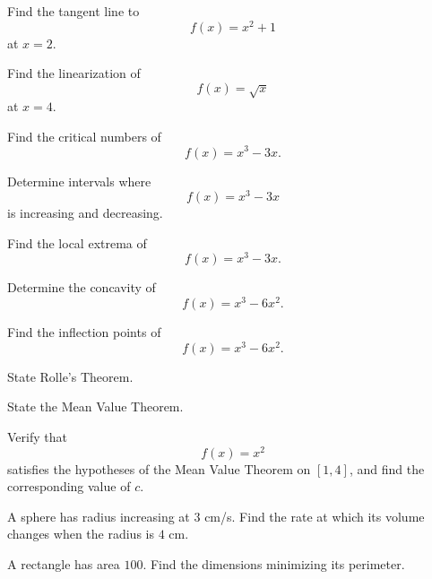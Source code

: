 \begin{exercise}[2]
Find the tangent line to
\[ f(x)=x^2+1 \]
at \(x=2\).
\end{exercise}

\begin{exercise}[2]
Find the linearization of
\[ f(x)=\sqrt{x} \]
at \(x=4\).
\end{exercise}

\begin{exercise}[1]
Find the critical numbers of
\[ f(x)=x^3-3x. \]
\end{exercise}

\begin{exercise}[2]
Determine intervals where
\[ f(x)=x^3-3x \]
is increasing and decreasing.
\end{exercise}

\begin{exercise}[2]
Find the local extrema of
\[ f(x)=x^3-3x. \]
\end{exercise}

\begin{exercise}[2]
Determine the concavity of
\[ f(x)=x^3-6x^2. \]
\end{exercise}

\begin{exercise}[2]
Find the inflection points of
\[ f(x)=x^3-6x^2. \]
\end{exercise}

\begin{exercise}[1]
State Rolle's Theorem.
\end{exercise}

\begin{exercise}[1]
State the Mean Value Theorem.
\end{exercise}

\begin{exercise}[2]
Verify that
\[ f(x)=x^2 \]
satisfies the hypotheses of the Mean Value Theorem on \([1,4]\), and find
the corresponding value of \(c\).
\end{exercise}

\begin{exercise}[2]
A sphere has radius increasing at \(3\) cm/s. Find the rate at which its
volume changes when the radius is \(4\) cm.
\end{exercise}

\begin{exercise}[2]
A rectangle has area \(100\). Find the dimensions minimizing its perimeter.
\end{exercise}

